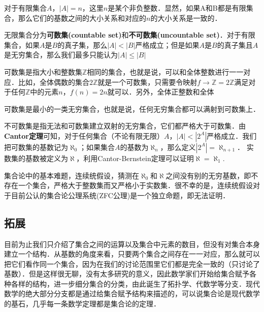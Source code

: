 对于有限集合$A$，$|A|=n$，这里$n$是某个非负整数．显然，如果A和B都是有限集合，那么它们的基数之间的大小关系和对应的$n$的大小关系是一致的．

无限集合分为\textbf{可数集(countable set)}和\textbf{不可数集(uncountable set)}．对于有限集合，如果$A$是$B$的真子集，那么$|A|<|B|$严格成立；但是如果$A$是$B$的真子集且$A$是无穷集合，那么我们最多只能认为$|A|≤|B|$

可数集是指大小和整数集$\mathbb{Z}$相同的集合，也就是说，可以和全体整数进行一一对应．比如，全体偶数的集合$2\mathbb{Z}$就是一个可数集，只需要令映射$f\rightarrow \mathbb{Z}=2\mathbb{Z}$满足对于任何$\mathbb{Z}$中的元素$n$，$f(n)=2n$就可以．另外，全体正整数和全体

可数集是最小的一类无穷集合，也就是说，任何无穷集合都可以满射到可数集上．

不可数集是指无法和可数集建立双射的无穷集合，它们都严格大于可数集．由\textbf{Cantor定理}可知，对于任何集合（不论有限无限）$A$，$|A|<|2^A|$严格成立．我们把可数集的基数记为$\aleph_0$；如果集合$A$的基数为$\aleph_n$，那么定义$|2^A|=\aleph_{n+1}$． 实数集的基数被定义为$\aleph$，利用Cantor-Bernstein定理可以证明$\aleph=\aleph_1$. 

集合论中的基本难题，连续统假设，猜测在$\aleph_0$和$\aleph$之间没有别的无穷基数，即不存在一个集合，严格大于整数集而又严格小于实数集．很不幸的是，连续统假设对于目前公认的集合论公理系统(ZFC公理)是一个独立命题，即无法证明．

\subsection{拓展}

目前为止我们只介绍了集合之间的运算以及集合中元素的数目，但没有对集合本身建立一个结构．从基数的角度来看，只要两个集合之间存在一一对应，那么就可以把它们看作同一个集合，因为在我们的讨论范围里它们都是完全一致的（只讨论了基数）．但是这样很无聊，没有太多研究的意义，因此数学家们开始给集合赋予各种各样的结构，进一步细分集合的分类，由此诞生了拓扑学、代数学等分支．现代数学的绝大部分分支都是通过给集合赋予结构来描述的，可以说集合论是现代数学的基石，几乎每一条数学定理都是集合论的定理．